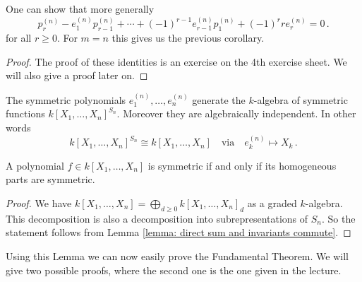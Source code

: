 \begin{remark}
  One can show that more generally
  \[
      p^{(n)}_r - e^{(n)}_1 p^{(n)}_{r-1} + \dotsb + (-1)^{r-1} e^{(n)}_{r-1} p^{(n)}_1 + (-1)^r r e^{(n)}_r
    = 0 \,.
  \]
  for all $r \geq 0$.
  For $m = n$ this gives us the previous corollary.
\end{remark}
\begin{proof}
  The proof of these identities is an exercise on the 4th exercise sheet.
  We will also give a proof later on.
\end{proof}


\begin{theorem}
  The symmetric polynomials $e^{(n)}_1, \dotsc, e^{(n)}_n$ generate the $k$-algebra of symmetric functions $k[X_1, \dotsc, X_n]^{S_n}$.
  Moreover they are algebraically independent.
  In other words
  \[
            k[X_1, \dotsc, X_n]^{S_n}
    \cong   k[X_1, \dotsc, X_n]
    \quad\text{via}\quad
            e^{(n)}_k
    \mapsto X_k \,.
  \]
\end{theorem}


\begin{lemma}
  A polynomial $f \in k[X_1, \dotsc, X_n]$ is symmetric if and only if its homogeneous parts are symmetric.
\end{lemma}
\begin{proof}
  We have $k[X_1, \dotsc, X_n] = \bigoplus_{d \geq 0} k[X_1, \dotsc, X_n]_d$ as a graded $k$-algebra.
  This decomposition is also a decomposition into subrepresentations of $S_n$.
  So the statement follows from Lemma \ref{lemma: direct sum and invariants commute}.
\end{proof}


Using this Lemma we can now easily prove the Fundamental Theorem.
We will give two possible proofs, where the second one is the one given in the lecture.


